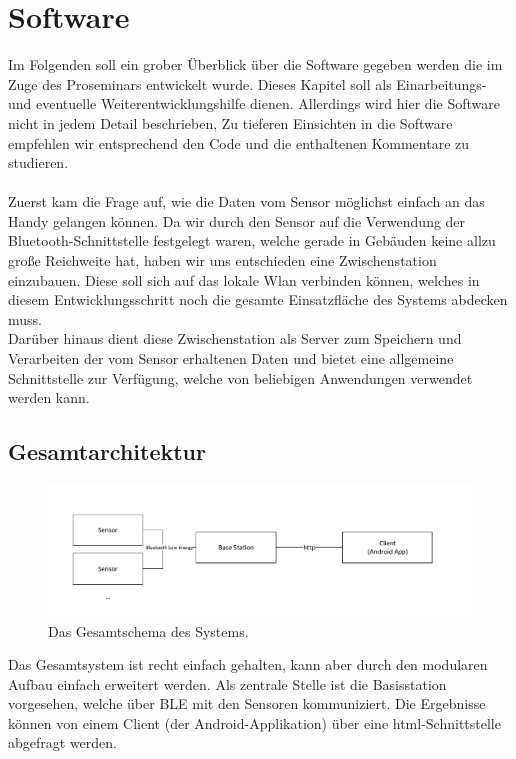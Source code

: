 \section{Software}
Im Folgenden soll ein grober Überblick über die Software gegeben werden die im Zuge des Proseminars entwickelt wurde. Dieses Kapitel soll als Einarbeitungs- und eventuelle Weiterentwicklungshilfe dienen. Allerdings wird hier die Software nicht in jedem Detail beschrieben, Zu tieferen Einsichten in die Software empfehlen wir entsprechend den Code und die enthaltenen Kommentare zu studieren.
\\
\\
Zuerst kam die Frage auf, wie die Daten vom Sensor möglichst einfach an das Handy gelangen können. Da wir durch den Sensor auf die Verwendung der Bluetooth-Schnittstelle festgelegt waren, welche gerade in Gebäuden keine allzu große Reichweite hat, haben wir uns entschieden eine Zwischenstation einzubauen. Diese soll sich auf das lokale Wlan verbinden können, welches in diesem Entwicklungsschritt noch die gesamte Einsatzfläche des Systems abdecken muss. \\
Darüber hinaus dient diese Zwischenstation als Server zum Speichern und Verarbeiten der vom Sensor erhaltenen Daten und bietet eine allgemeine Schnittstelle zur Verfügung, welche von beliebigen Anwendungen verwendet werden kann.
\subsection{Gesamtarchitektur}
\begin{figure}[htb] 
	\centerline{\includegraphics[scale=.5]{Architektur/dryR_complete.pdf}}
	\caption{Das Gesamtschema des Systems.}
\end{figure}

Das Gesamtsystem ist recht einfach gehalten, kann aber durch den modularen Aufbau einfach erweitert werden. Als zentrale Stelle ist die Basisstation vorgesehen, welche über BLE mit den Sensoren kommuniziert. Die Ergebnisse können von einem Client (der Android-Applikation) über eine html-Schnittstelle abgefragt werden.
